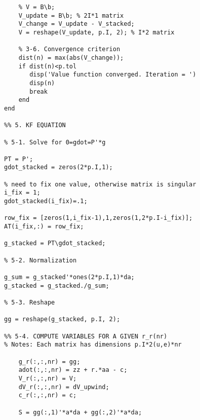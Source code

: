 \begin{lstlisting}
    % V = B\b;
    V_update = B\b; % 2I*1 matrix
    V_change = V_update - V_stacked;
    V = reshape(V_update, p.I, 2); % I*2 matrix

    % 3-6. Convergence criterion
    dist(n) = max(abs(V_change));
    if dist(n)<p.tol
       disp('Value function converged. Iteration = ')
       disp(n)
       break
    end
end

%% 5. KF EQUATION

% 5-1. Solve for 0=gdot=P'*g

PT = P';
gdot_stacked = zeros(2*p.I,1);

% need to fix one value, otherwise matrix is singular
i_fix = 1;
gdot_stacked(i_fix)=.1;

row_fix = [zeros(1,i_fix-1),1,zeros(1,2*p.I-i_fix)];
AT(i_fix,:) = row_fix;

g_stacked = PT\gdot_stacked; 

% 5-2. Normalization

g_sum = g_stacked'*ones(2*p.I,1)*da;
g_stacked = g_stacked./g_sum;

% 5-3. Reshape

gg = reshape(g_stacked, p.I, 2);

%% 5-4. COMPUTE VARIABLES FOR A GIVEN r_r(nr)
% Notes: Each matrix has dimensions p.I*2(u,e)*nr

    g_r(:,:,nr) = gg;
    adot(:,:,nr) = zz + r.*aa - c;
    V_r(:,:,nr) = V;
    dV_r(:,:,nr) = dV_upwind;
    c_r(:,:,nr) = c;
    
    S = gg(:,1)'*a*da + gg(:,2)'*a*da;





\end{lstlisting}



